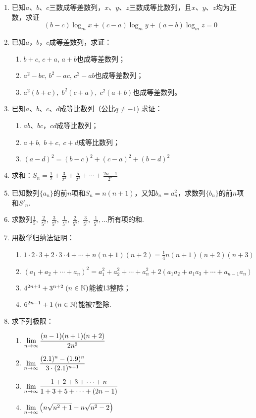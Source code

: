 \begin{enumerate}
\item 已知$a$、$b$、$c$三数成等差数列，$x$、$y$、$z$三数成等比数列，且$x$、$y$、$z$均为正数，求证
\[(b-c)\log_m x+(c-a)\log_m y+(a-b)\log_m z=0\]
\item 已知$a$，$b$，$c$成等差数列，求证：
\begin{enumerate}[(1)]
\item $b+c$, $c+a$, $a+b$也成等差数列；
\item $a^2-bc$, $b^2-ac$, $c^2-ab$也成等差数列；
\item $a^2(b+c),\; b^2(c+a),\; c^2(a+b)$也成等差数列。
\end{enumerate}

\item 已知$a$、$b$、$c$、$d$成等比数列（公比$q\ne -1$)
求证：
\begin{enumerate}[(1)]
\item $ab$、$bc$，$cd$成等比数列；
\item $a+b,\; b+c,\; c+d$成等比数列；
\item $(a-d)^2=(b-c)^2+(c-a)^2+(b-d)^2$
\end{enumerate}
\item 求和：$S_n=\frac{1}{2}+\frac{3}{2^2}+\frac{5}{2^3}+\cdots+\frac{2n-1}{2^n}$
\item 已知数列$\{a_n\}$的前$n$项和$S_n=n(n+1)$，又知$b_n=a^2_n$，求数列$\{b_n\}$的前$n$项和$S'_n$.

\item 求数列$\frac{1}{5},\; \frac{2}{5^2},\; \frac{3}{5^3},\; \frac{1}{5^4},\; \frac{2}{5^5},\; \frac{3}{5^6},\; \frac{1}{5^7},\ldots$所有项的和.

\item 用数学归纳法证明：
\begin{enumerate}[(1)]
    \item $1\cdot 2\cdot 3+2\cdot 3\cdot 4+\cdots+n(n+1)(n+2)=\frac{1}{4}n(n+1)(n+2)(n+3)$
    \item $(a_1+a_2+\cdots+a_n)^2=a^2_1+a^2_2+\cdots +a^2_n+2(a_1a_2+a_1a_3+\cdots+a_{n-1}a_n)$
    \item $4^{2n+1}+3^{n+2}\; (n\in\mathbb{N})$能被13整除；
    \item $6^{2n-1}+1\; (n\in\mathbb{N})$能被7整除.
\end{enumerate}

\item 求下列极限：
\begin{multicols}{2}
\begin{enumerate}[(1)]
    \item $\lim\limits_{n\to \infty}\dfrac{(n-1)(n+1)(n+2)}{2n^3}$
    \item $\lim\limits_{n\to \infty}\dfrac{(2.1)^n-(1.9)^n}{3\cdot (2.1)^{n+1}}$
    \item $\lim\limits_{n\to \infty}\dfrac{1+2+3+\cdots+n}{1+3+5+\cdots+(2n-1)}$
    \item $\lim\limits_{n\to \infty}\left(n\sqrt{n^2+1}-n\sqrt{n^2-2}\right)$
\end{enumerate}
\end{multicols}


\end{enumerate}
